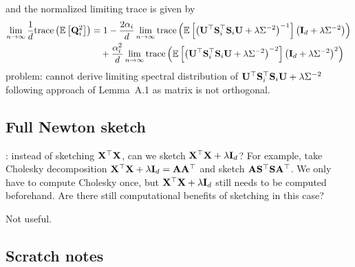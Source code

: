 \documentclass[10pt]{article}
\begin{document}
and the normalized limiting trace is given by
\begin{align*}
\lim_{n\rightarrow\infty}\frac{1}{d}\mathrm{trace}\left(\mathbb{E}\left[\mathbf{Q}_i^2\right]\right) &= 1 - \frac{2\alpha_i}{d}\lim_{n\rightarrow\infty}\mathrm{trace}\left(\mathbb{E}\left[\left(\mathbf{U}^\top\mathbf{S}_i^\top\mathbf{S}_i\mathbf{U} + \lambda\Sigma^{-2}\right)^{-1}\right]\left(\mathbf{I}_d + \lambda\Sigma^{-2}\right)\right) \\
&\quad + \frac{\alpha_i^2}{d}\lim_{n\rightarrow\infty}\mathrm{trace}\left(\mathbb{E}\left[\left(\mathbf{U}^\top\mathbf{S}_i^\top\mathbf{S}_i\mathbf{U} + \lambda\Sigma^{-2}\right)^{-2}\right]\left(\mathbf{I}_d + \lambda\Sigma^{-2}\right)^2\right)
\end{align*}
\todo problem: cannot derive limiting spectral distribution of $\mathbf{U}^\top\mathbf{S}_i^\top\mathbf{S}_i\mathbf{U} + \lambda\Sigma^{-2}$ following approach of Lemma~A.1 as matrix is not orthogonal.


\subsection{Full Newton sketch}

\todo: instead of sketching $\mathbf{X}^\top\mathbf{X}$, can we sketch $\mathbf{X}^\top\mathbf{X}+\lambda\mathbf{I}_d$? For example, take Cholesky decomposition $\mathbf{X}^\top\mathbf{X}+\lambda\mathbf{I}_d = \mathbf{A}\mathbf{A}^\top$ and sketch $\mathbf{A}\mathbf{S}^\top\mathbf{S}\mathbf{A}^\top$. We only have to compute Cholesky once, but $\mathbf{X}^\top\mathbf{X}+\lambda\mathbf{I}_d$ still needs to be computed beforehand. Are there still computational benefits of sketching in this case?

Not useful.


\subsection{Scratch notes}
\end{document}
